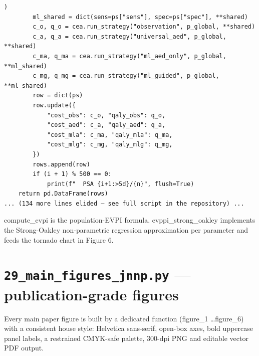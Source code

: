 \documentclass[11pt,a4paper]{article}
\begin{document}
\begin{lstlisting}[style=codeblock]
        )
        ml_shared = dict(sens=ps["sens"], spec=ps["spec"], **shared)
        c_o, q_o = cea.run_strategy("observation", p_global, **shared)
        c_a, q_a = cea.run_strategy("universal_aed", p_global, **shared)
        c_ma, q_ma = cea.run_strategy("ml_aed_only", p_global, **ml_shared)
        c_mg, q_mg = cea.run_strategy("ml_guided", p_global, **ml_shared)
        row = dict(ps)
        row.update({
            "cost_obs": c_o, "qaly_obs": q_o,
            "cost_aed": c_a, "qaly_aed": q_a,
            "cost_mla": c_ma, "qaly_mla": q_ma,
            "cost_mlg": c_mg, "qaly_mlg": q_mg,
        })
        rows.append(row)
        if (i + 1) % 500 == 0:
            print(f"  PSA {i+1:>5d}/{n}", flush=True)
    return pd.DataFrame(rows)
... (134 more lines elided — see full script in the repository) ...
\end{lstlisting}

compute\_evpi is the population-EVPI formula. evppi\_strong\_oakley implements the Strong-Oakley non-parametric regression approximation per parameter and feeds the tornado chart in Figure 6.
\clearpage
\section{\texttt{29\_main\_figures\_jnnp.py} — publication-grade figures}
Every main paper figure is built by a dedicated function (figure\_1 \ldots  figure\_6) with a consistent house style: Helvetica sans-serif, open-box axes, bold uppercase panel labels, a restrained CMYK-safe palette, 300-dpi PNG and editable vector PDF output.
\end{document}
